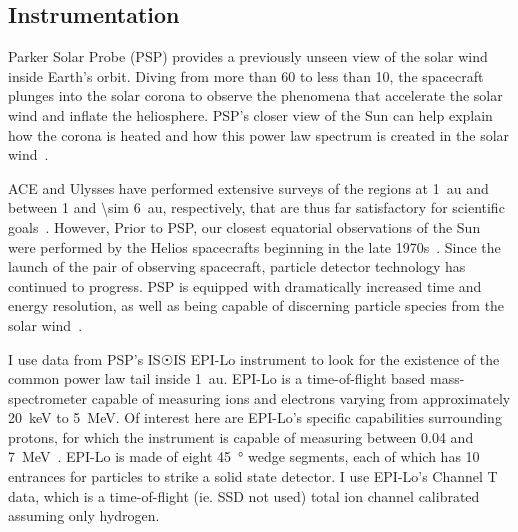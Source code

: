 \documentclass[letterpaper,11pt]{article}
\begin{document}
\subsection{Instrumentation}
Parker Solar Probe (PSP) provides a previously unseen view of the solar wind inside Earth's orbit.  Diving from more than 60 to less than \SI{10}{\solarradius}, the spacecraft plunges into the solar corona to observe the phenomena that accelerate the solar wind and inflate the heliosphere.  PSP's closer view of the Sun can help explain how the corona is heated and how this power law spectrum is created in the solar wind~\citep{McComas2014,McComas2007}.

ACE and Ulysses have performed extensive surveys of the regions at \SI{1}{\astronomicalunit} and between 1 and \SI{\sim 6}{\astronomicalunit}, respectively, that are thus far satisfactory for scientific goals~\citep{McComas2007}.  However, Prior to PSP, our closest equatorial observations of the Sun were performed by the Helios spacecrafts beginning in the late 1970s~\citep{McComas2007}.  Since the launch of the pair of observing spacecraft, particle detector technology has continued to progress.  PSP is equipped with dramatically increased time and energy resolution, as well as being capable of discerning particle species from the solar wind~\citep{McComas2014}.

I use data from PSP's IS$\Sun$IS EPI-Lo instrument to look for the existence of the common power law tail inside \SI{1}{\astronomicalunit}.  EPI-Lo is a time-of-flight based mass-spectrometer capable of measuring ions and electrons varying from approximately \SI{20}{\kilo\electronvolt} to \SI{5}{\mega\electronvolt}.  Of interest here are EPI-Lo's specific capabilities surrounding protons, for which the instrument is capable of measuring between 0.04 and \SI{7}{\mega\electronvolt}~\citep{McComas2014}.  EPI-Lo is made of eight \SI{45}{\degree} wedge segments, each of which has 10 entrances for particles to strike a solid state detector.  I use EPI-Lo's Channel T data, which is a time-of-flight (ie. SSD not used) total ion channel calibrated assuming only hydrogen.


\end{document}
